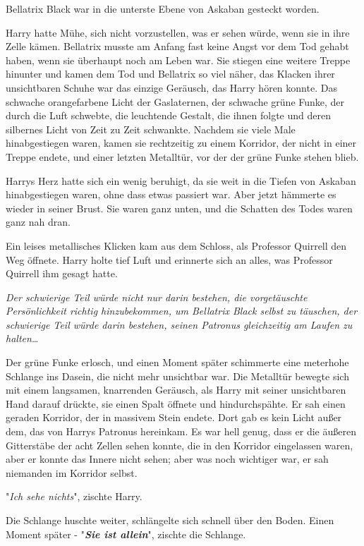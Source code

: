 {Bellatrix Black war in die unterste Ebene von Askaban gesteckt worden.

Harry hatte Mühe, sich nicht vorzustellen, was er sehen würde, wenn sie in ihre Zelle kämen. Bellatrix musste am Anfang fast keine Angst vor dem Tod gehabt haben, wenn sie überhaupt noch am Leben war. Sie stiegen eine weitere Treppe hinunter und kamen dem Tod und Bellatrix so viel näher, das Klacken ihrer unsichtbaren Schuhe war das einzige Geräusch, das Harry hören konnte. Das schwache orangefarbene Licht der Gaslaternen, der schwache grüne Funke, der durch die Luft schwebte, die leuchtende Gestalt, die ihnen folgte und deren silbernes Licht von Zeit zu Zeit schwankte. Nachdem sie viele Male hinabgestiegen waren, kamen sie rechtzeitig zu einem Korridor, der nicht in einer Treppe endete, und einer letzten Metalltür, vor der der grüne Funke stehen blieb.

Harrys Herz hatte sich ein wenig beruhigt, da sie weit in die Tiefen von Askaban hinabgestiegen waren, ohne dass etwas passiert war. Aber jetzt hämmerte es wieder in seiner Brust. Sie waren ganz unten, und die Schatten des Todes waren ganz nah dran.

Ein leises metallisches Klicken kam aus dem Schloss, als Professor Quirrell den Weg öffnete. Harry holte tief Luft und erinnerte sich an alles, was Professor Quirrell ihm gesagt hatte.

\emph{Der schwierige Teil würde nicht nur darin bestehen, die vorgetäuschte Persönlichkeit richtig hinzubekommen, um Bellatrix Black selbst zu täuschen, der schwierige Teil würde darin bestehen, seinen Patronus gleichzeitig am Laufen zu halten…}

Der grüne Funke erlosch, und einen Moment später schimmerte eine meterhohe Schlange ins Dasein, die nicht mehr unsichtbar war. Die Metalltür bewegte sich mit einem langsamen, knarrenden Geräusch, als Harry mit seiner unsichtbaren Hand darauf drückte, sie einen Spalt öffnete und hindurchspähte. Er sah einen geraden Korridor, der in massivem Stein endete. Dort gab es kein Licht außer dem, das von Harrys Patronus hereinkam. Es war hell genug, dass er die äußeren Gitterstäbe der acht Zellen sehen konnte, die in den Korridor eingelassen waren, aber er konnte das Innere nicht sehen; aber was noch wichtiger war, er sah niemanden im Korridor selbst.

"\emph{Ich sehe nichts}", zischte Harry.

Die Schlange huschte weiter, schlängelte sich schnell über den Boden. Einen Moment später - "\textbf{\emph{Sie ist allein}}", zischte die Schlange.

}
